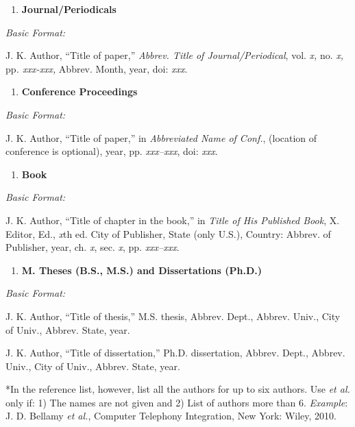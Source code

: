 \documentclass[
]{article}
\begin{document}
\begin{enumerate}
\def\labelenumi{\arabic{enumi}.}
\item
  \textbf{Journal/Periodicals}
\end{enumerate}

\emph{Basic Format:}

J. K. Author, ``Title of paper,'' \emph{Abbrev. Title of Journal/Periodical}, vol. \emph{x,} no. \emph{x,} pp\emph{. xxx-xxx,} Abbrev. Month, year, doi: \emph{xxx}.

\begin{enumerate}
\def\labelenumi{\arabic{enumi}.}
\setcounter{enumi}{1}
\item
  \textbf{Conference Proceedings}
\end{enumerate}

\emph{Basic Format:}

J. K. Author, ``Title of paper,'' in \emph{Abbreviated Name of Conf.}, (location of conference is optional), year, pp. \emph{xxx--xxx}, doi: \emph{xxx}.

\begin{enumerate}
\def\labelenumi{\arabic{enumi}.}
\setcounter{enumi}{2}
\item
  \textbf{Book}
\end{enumerate}

\emph{Basic Format:}

J. K. Author, ``Title of chapter in the book,'' in \emph{Title of His Published Book}, X. Editor, Ed., \emph{x}th ed. City of Publisher, State (only U.S.), Country: Abbrev. of Publisher, year, ch. \emph{x}, sec. \emph{x}, pp. \emph{xxx--xxx}.

\begin{enumerate}
\def\labelenumi{\arabic{enumi}.}
\setcounter{enumi}{3}
\item
  \textbf{M. Theses (B.S., M.S.) and Dissertations (Ph.D.)}
\end{enumerate}

\emph{Basic Format:}

J. K. Author, ``Title of thesis,'' M.S. thesis, Abbrev. Dept., Abbrev. Univ., City of Univ., Abbrev. State, year.

J. K. Author, ``Title of dissertation,'' Ph.D. dissertation, Abbrev. Dept., Abbrev. Univ., City of Univ., Abbrev. State, year.

*In the reference list, however, list all the authors for up to six authors. Use \emph{et al.} only if: 1) The names are not given and 2) List of authors more than 6. \emph{Example}: J. D. Bellamy \emph{et al.}, Computer Telephony Integration, New York: Wiley, 2010.
\end{document}

